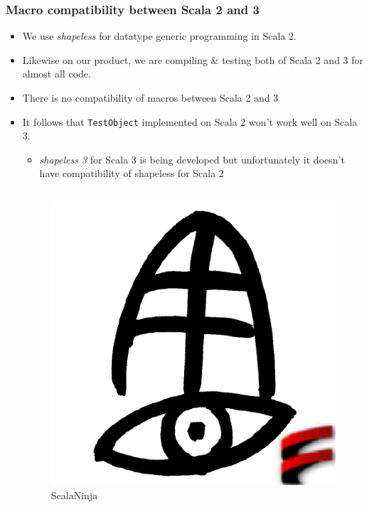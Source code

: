 \begin{frame}
  \frametitle{Macro compatibility between Scala 2 and 3}

  \begin{itemize}
    \item We use \emph{shapeless}\cite{shapeless_github} for datatype generic programming in Scala 2.

    \pause
    \item Likewise on our product, we are compiling \& testing both of Scala 2 and 3 for almost all code.

    \pause
    \item There is no compatibility of macros between Scala 2 and 3 

    \pause
    \item It follows that \lstinline|TestObject| implemented on Scala 2 won't work well on Scala 3.
    \begin{itemize}
      \item \emph{shapeless 3}\cite{shapeless-3_github} for Scala 3 is being developed but unfortunately
      it doesn't have compatibility of shapeless for Scala 2
    \end{itemize}

    \pause
    \begin{columns}
      \begin{column}{0.2\textwidth}
        \begin{figure}[h]
          \includegraphics[width=0.6\columnwidth]{img/xuwei.png}
          \caption{ScalaNinja}
          \label{fig:scalaninja}
        \end{figure}
      \end{column}
    \end{columns}
  \end{itemize}


\end{frame}
